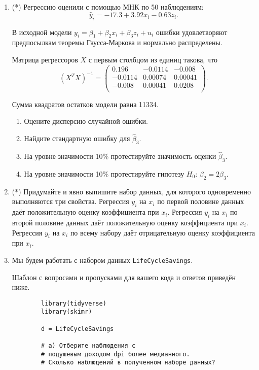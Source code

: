 \documentclass[12pt]{article}
\begin{document}
\begin{enumerate}
\newpage
    \item (*) Регрессию оценили с помощью МНК по 50 наблюдениям:
    \[
    \hat y_i = -17.3 + 3.92 x_i - 0.63 z_i.    
    \]

    В исходной модели $y_i = \beta_1 + \beta_2 x_i + \beta_3 z_i + u_i$ ошибки удовлетворяют 
    предпосылкам теоремы Гаусса-Маркова и нормально распределены.


    Матрица регрессоров $X$ с первым столбцом из единиц такова, что 
    \[
    (X^TX)^{-1} = \begin{pmatrix}
        0.196 & -0.0114 & -0.008 \\
        -0.0114 &  0.00074 & 0.00041 \\
        -0.008 & 0.00041 & 0.0208 \\
    \end{pmatrix}.    
    \]

    Сумма квадратов остатков модели равна 11334.

\begin{enumerate}
    \item Оцените дисперсию случайной ошибки.
    \item Найдите стандартную ошибку для $\hat\beta_3$.
    \item На уровне значимости 10\% протестируйте значимость оценки $\hat\beta_3$.
    \item На уровне значимости 10\% протестируйте гипотезу $H_0$: $\beta_2 = 2 \beta_3$.
\end{enumerate}


\item (*) Придумайте и явно выпишите набор данных, для которого одновременно выполняются три свойства. 
Регрессия $y_i$ на $x_i$ по первой половине данных даёт положительную оценку коэффициента при $x_i$.
Регрессия $y_i$ на $x_i$ по второй половине данных даёт положительную оценку коэффициента при $x_i$.
Регрессия $y_i$ на $x_i$ по всему набору даёт отрицательную оценку коэффициента при $x_i$.


\newpage
    \item Мы будем работать с набором данных \verb|LifeCycleSavings|.

    Шаблон с вопросами и пропусками для вашего кода и ответов приведён ниже. 

    \begin{verbatim}
        library(tidyverse)
        library(skimr)

        d = LifeCycleSavings

        # а) Отберите наблюдения с 
        # подушевым доходом dpi более медианного.
        # Сколько наблюдений в полученном наборе данных?


\end{verbatim}
\end{enumerate}
\end{document}
